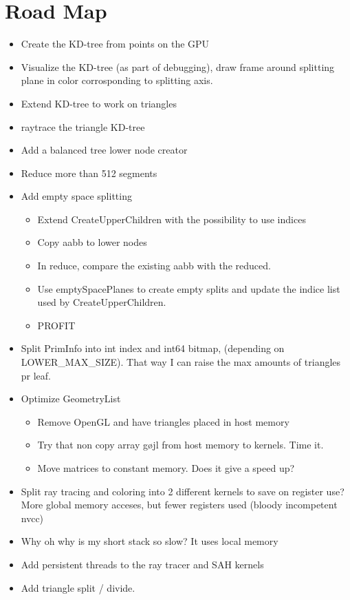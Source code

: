 \section*{Road Map}


\begin{itemize}
\item Create the KD-tree from points on the GPU \checkmark
\item Visualize the KD-tree (as part of debugging), draw frame around
  splitting plane in color corrosponding to splitting axis. \checkmark
\item Extend KD-tree to work on triangles \checkmark
\item raytrace the triangle KD-tree \checkmark
\item Add a balanced tree lower node creator \checkmark
\item Reduce more than 512 segments \checkmark
\item Add empty space splitting
  \begin{itemize}
    \item Extend CreateUpperChildren with the possibility to use indices \checkmark
    \item Copy aabb to lower nodes \checkmark
    \item In reduce, compare the existing aabb with the reduced. \checkmark
    \item Use emptySpacePlanes to create empty splits and update the
      indice list used by CreateUpperChildren.
    \item PROFIT
  \end{itemize}
\item Split PrimInfo into int index and int64 bitmap, (depending on
  LOWER\_MAX\_SIZE). That way I can raise the max amounts of triangles
  pr leaf.
\item Optimize GeometryList
  \begin{itemize}
  \item Remove OpenGL and have triangles placed in host memory
  \item Try that non copy array gøjl from host memory to kernels. Time
    it.
  \item Move matrices to constant memory. Does it give a speed up?
  \end{itemize}
\item Split ray tracing and coloring into 2 different kernels to save
  on register use? More global memory acceses, but fewer registers
  used (bloody incompetent nvcc)
\item Why oh why is my short stack so slow? It uses local memory
\item Add persistent threads to the ray tracer and SAH kernels
\item Add triangle split / divide.
\end{itemize}

